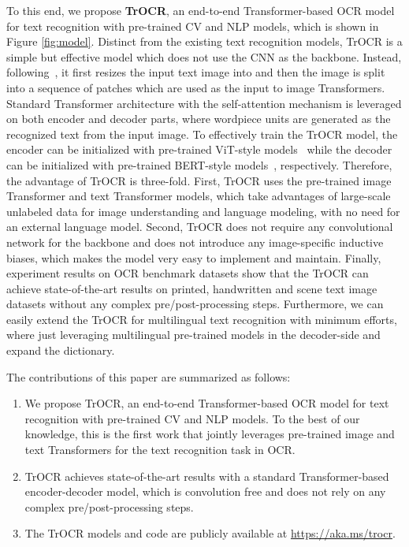 \documentclass[letterpaper]{article} \usepackage{aaai23}  \usepackage{times}  \usepackage{helvet}  \usepackage{courier}  \usepackage[hyphens]{url}  \usepackage{graphicx} \urlstyle{rm} \def\UrlFont{\rm}  \usepackage{natbib}  \usepackage{caption} \frenchspacing  \setlength{\pdfpagewidth}{8.5in} \setlength{\pdfpageheight}{11in} \usepackage{algorithm}
\begin{document}
To this end, we propose \textbf{TrOCR}, an end-to-end Transformer-based OCR model for text recognition with pre-trained CV and NLP models, which is shown in Figure \ref{fig:model}. Distinct from the existing text recognition models, TrOCR is a simple but effective model which does not use the CNN as the backbone. Instead, following~\citep{dosovitskiy2020vit}, it first resizes the input text image into  and then the image is split into a sequence of  patches which are used as the input to image Transformers. Standard Transformer architecture with the self-attention mechanism is leveraged on both encoder and decoder parts, where wordpiece units are generated as the recognized text from the input image. To effectively train the TrOCR model, the encoder can be initialized with pre-trained ViT-style models~\citep{dosovitskiy2020vit,touvron2020deit,bao2021beit} while the decoder can be initialized with pre-trained BERT-style models~\citep{devlin2019bert,liu2019roberta,dong2019unified, wang2020minilm}, respectively. Therefore, the advantage of TrOCR is three-fold. First, TrOCR uses the pre-trained image Transformer and text Transformer models, which take advantages of large-scale unlabeled data for image understanding and language modeling, with no need for an external language model. Second, TrOCR does not require any convolutional network for the backbone and does not introduce any image-specific inductive biases, which makes the model very easy to implement and maintain. Finally, experiment results on OCR benchmark datasets show that the TrOCR can achieve state-of-the-art results on printed, handwritten and scene text image datasets without any complex pre/post-processing steps. Furthermore, we can easily extend the TrOCR for multilingual text recognition with minimum efforts, where just leveraging multilingual pre-trained models in the decoder-side and expand the dictionary.

The contributions of this paper are summarized as follows:
\begin{enumerate}
    \item We propose TrOCR, an end-to-end Transformer-based OCR model for text recognition with pre-trained CV and NLP models. To the best of our knowledge, this is the first work that jointly leverages pre-trained image and text Transformers for the text recognition task in OCR. 
    \item TrOCR achieves state-of-the-art results with a standard Transformer-based encoder-decoder model, which is convolution free and does not rely on any complex pre/post-processing steps.
    \item The TrOCR models and code are publicly available at \url{https://aka.ms/trocr}.
\end{enumerate}
\end{document}
